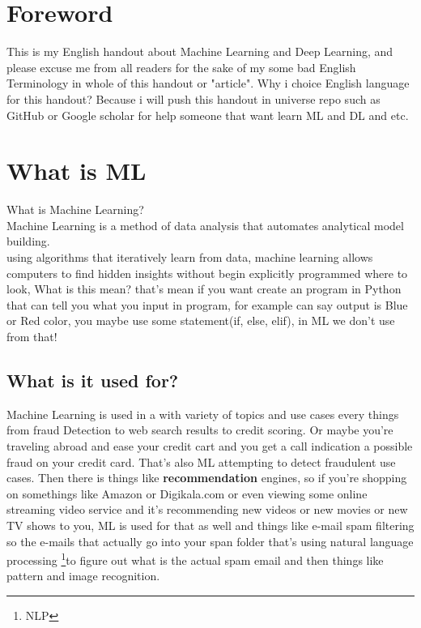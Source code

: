 \documentclass[12pt]{article}
\begin{document}
\tableofcontents

\section{Foreword}
This is my English handout about Machine Learning and Deep Learning, and please excuse me from all readers for the sake of my some bad English Terminology in whole of this handout or "article". Why i choice English language for this handout? Because i will push this handout in universe repo such as GitHub or Google scholar for help someone that want learn ML and DL and etc.

\newpage

\section{What is ML}

\LARGE What is Machine Learning?\\
\small Machine Learning is a method of data analysis that automates analytical model building.\\
using algorithms that iteratively learn from data, machine learning allows computers to find hidden insights without begin explicitly programmed where to look, What is this mean? that's mean if you want create an program in Python that can tell you what you input in program, for example can say output is Blue or Red color, you maybe use some statement(if, else, elif), in ML we don't use from that!

\subsection{What is it used for?}
Machine Learning is used in a with variety of topics and use cases every things from fraud Detection to web search results to credit scoring. Or maybe you're traveling abroad and ease your credit cart and you get a call indication a possible fraud on your credit card. That's also ML attempting to detect fraudulent use cases. Then there is things like \textbf{recommendation} engines, so if you're shopping on somethings like Amazon or Digikala.com or even viewing some online streaming video service and it's recommending new videos or new movies or new TV shows to you, ML is used for that as well and things like e-mail spam filtering so the e-mails that actually go into your span folder that's using natural language processing
\footnote{NLP}to figure out what is the actual spam email and then things like pattern and image recognition. \\
\end{document}
